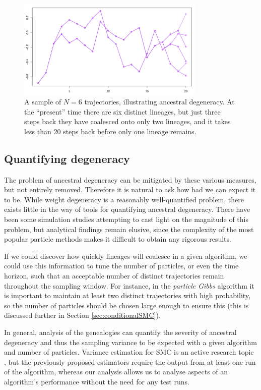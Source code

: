 \documentclass[fleqn]{article}
\theoremstyle{definition}
\begin{document}
\begin{figure}
\centering
\includegraphics[width=0.8\textwidth]{degeneracy.pdf}
\caption{A sample of $N=6$ trajectories, illustrating ancestral degeneracy. At the ``present'' time there are six distinct lineages, but just three steps back they have coalesced onto only two lineages, and it takes less than 20 steps back before only one lineage remains.}
\label{fig:degeneracy}
\end{figure}

\subsection{Quantifying degeneracy}
The problem of ancestral degeneracy can be mitigated by these various measures, but not entirely removed. Therefore it is natural to ask how bad we can expect it to be. While weight degeneracy is a reasonably well-quantified problem, there exists little in the way of tools for quantifying ancestral degeneracy. There have been some simulation studies attempting to cast light on the magnitude of this problem, but analytical findings remain elusive, since the complexity of the most popular particle methods makes it difficult to obtain any rigorous results.

If we could discover how quickly lineages will coalesce in a given algorithm, we could use this information to tune the number of particles, or even the time horizon, such that an acceptable number of distinct trajectories remain throughout the sampling window.
For instance, in the \emph{particle Gibbs} algorithm it is important to maintain at least two distinct trajectories with high probability, so the number of particles should be chosen large enough to ensure this (this is discussed further in Section \ref{sec:conditionalSMC}).

In general, analysis of the genealogies can quantify the severity of ancestral degeneracy and thus the sampling variance to be expected with a given algorithm and number of particles.
Variance estimation for SMC is an active research topic \citep{chan2013, lee2018, olsson2019}, but the previously proposed estimators require the output from at least one run of the algorithm, whereas our analysis allows us to analyse aspects of an algorithm's performance without the need for any test runs.
\end{document}
